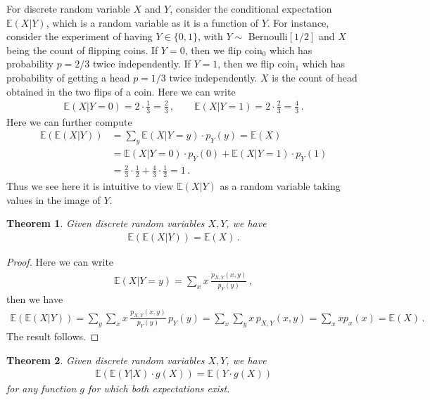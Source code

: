 \documentclass[11pt, onesided]{book}
\theoremstyle{break}
\theoremstyle{break}
\newtheorem{thm}{Theorem}[section]
\begin{document}
For discrete random variable $X$ and $Y$, consider the conditional expectation $\mathbb{E}(X|Y)$, which is a random variable as it is a function of $Y$. For instance, consider the experiment of having $Y\in \{0,1\}$, with $Y \sim$ Bernoulli$[1/2]$ and $X$ being the count of flipping coins. If $Y = 0$, then we flip coin$_0$ which has probability $p = 2/3$ twice independently. If $Y = 1$, then we flip coin$_1$ which has probability of getting a head $p = 1/3$ twice independently. $X$ is the count of head obtained in the two flips of a coin.  Here we can write
\begin{align*}
\mathbb{E}(X|Y = 0) = 2 \cdot \frac{1}{3} = \frac{2}{3}\,, \qquad
\mathbb{E}(X|Y=1) = 2\cdot \frac{2}{3} = \frac{4}{3}\,.
\end{align*}
Here we can further compute
\begin{align*}
\mathbb{E}(\mathbb{E}(X|Y)) &= \sum_{y}\mathbb{E}(X|Y = y)\cdot p_Y(y) =\mathbb{E}(X) \\
&= \mathbb{E}(X|Y = 0)\cdot p_Y(0) + \mathbb{E}(X|Y = 1)\cdot p_Y(1)  \\
&= \frac{2}{3}\cdot \frac{1}{2} + \frac{4}{3}\cdot \frac{1}{2} = 1\,.
\end{align*}
Thus we see here it is intuitive to view $\mathbb{E}(X|Y)$ as a random variable taking values in the image of $Y$. 

\begin{thm}
Given discrete random variables $X,Y$, we have
\begin{align*}
\mathbb{E}(\mathbb{E}(X|Y)) = \mathbb{E}(X)\,.
\end{align*}
\end{thm}
\begin{proof}
Here we can write 
\begin{align*}
\mathbb{E}(X|Y=y) = \sum_x x\,\frac{p_{X,Y}(x,y)}{p_Y(y)}\,,
\end{align*}
then we have
\begin{align*}
\mathbb{E}(\mathbb{E}(X|Y)) = \sum_y \sum_x x \, \frac{p_{X,Y}(x,y)}{p_Y(y)}\, p_Y(y) = \sum_x\sum_y  x\, p_{X,Y}(x,y) = \sum_x x p_x(x) = \mathbb{E}(X)\,.
\end{align*}
The result follows.
\end{proof}
\begin{thm}
Given discrete random variables $X,Y$, we have
\begin{align*}
\mathbb{E}(\mathbb{E}(Y|X)\cdot g(X)) = \mathbb{E}(Y\cdot g(X))
\end{align*}
for any function $g$ for which both expectations exist. 
\end{thm}
\end{document}
